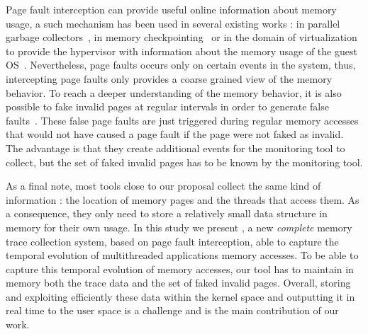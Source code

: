 Page fault interception can provide useful online information about memory usage,
a such mechanism has been used in several existing works : in parallel
garbage collectors~\cite{Boehm91Mostly}, in memory
checkpointing~\cite{Heo05Spaceefficient} or in the domain of virtualization to
provide the hypervisor with information about the memory usage of the guest
OS~\cite{Jones06Geiger}. Nevertheless, page faults occurs only on certain
events in the system, thus, intercepting page faults only provides a coarse grained view of the
memory behavior. To reach a deeper understanding of the memory behavior,
it is also possible to fake invalid pages at regular intervals in order to generate false faults~\cite{Bae12Dynamic,Diener13CommunicationBased}.
These false page faults are just triggered during regular memory accesses that would not have 
caused a page fault if the page were not faked as invalid. The advantage is that they create additional
events for the monitoring tool to collect, but the set of faked invalid pages has to be known by the monitoring tool.

As a final note, most tools close to our proposal collect the same kind of information : the location of memory pages and the threads that access them.
As a consequence, they only need to store a relatively small data structure in memory for their own usage.
In this study we present \Moca, a new \emph{complete} memory trace collection system, based on page
fault interception, able to capture the temporal evolution of multithreaded applications memory accesses.
To be able to capture this temporal evolution of memory accesses, our tool has to maintain in memory both the trace data and
the set of faked invalid pages. Overall, storing and exploiting efficiently these data within the kernel space and outputting it in real time to the user space
is a challenge and is the main contribution of our work.

